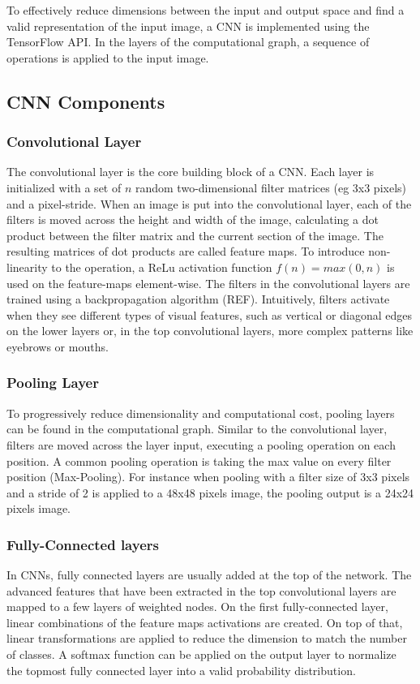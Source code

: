 \documentclass[twoside]{article}
\begin{document}
\begin{multicols}{2}
To effectively reduce dimensions between the input and output space and find a valid representation of the input image, a CNN is implemented using the TensorFlow API. In the layers of the computational graph, a sequence of operations is applied to the input image. 

\subsection{CNN Components}

\subsubsection{Convolutional Layer}
The convolutional layer is the core building block of a CNN. Each layer is initialized with a set of $n$ random two-dimensional filter matrices (eg 3x3 pixels) and a pixel-stride. When an image is put into the convolutional layer, each of the filters is moved across the height and width of the image, calculating a dot product between the filter matrix and the current section of the image. The resulting matrices of dot products are called feature maps. To introduce non-linearity to the operation, a ReLu activation function $f(n) = max(0, n)$ is used on the feature-maps element-wise. The filters in the convolutional layers are trained using a backpropagation algorithm (REF). Intuitively, filters activate when they see different types of visual features, such as vertical or diagonal edges on the lower layers or, in the top convolutional layers, more complex patterns like eyebrows or mouths.

\subsubsection{Pooling Layer}
To progressively reduce dimensionality and computational cost, pooling layers can be found in the computational graph. Similar to the convolutional layer, filters are moved across the layer input, executing a pooling operation on each position. A common pooling operation is taking the max value on every filter position (Max-Pooling). For instance when pooling with a filter size of 3x3 pixels and a stride of 2 is applied to a 48x48 pixels image, the pooling output is a 24x24 pixels image.

\subsubsection{Fully-Connected layers}
In CNNs, fully connected layers are usually added at the top of the network. The advanced features that have been extracted in the top convolutional layers are mapped to a few layers of weighted nodes. On the first fully-connected layer, linear combinations of the feature maps activations are created. On top of that, linear transformations are applied to reduce the dimension to match the number of classes. A softmax function can be applied on the output layer to normalize the topmost fully connected layer into a valid probability distribution.



\end{multicols}
\end{document}
